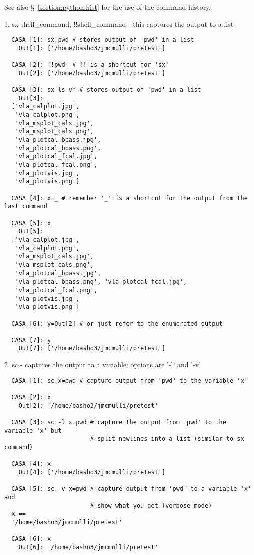 See also \S~\ref{section:python.hist} for the use of the command
history.

1. sx shell\_command, !!shell\_command - this captures the output to a list 

\small
\begin{verbatim}
  CASA [1]: sx pwd # stores output of 'pwd' in a list
    Out[1]: ['/home/basho3/jmcmulli/pretest']

  CASA [2]: !!pwd  # !! is a shortcut for 'sx'
    Out[2]: ['/home/basho3/jmcmulli/pretest']

  CASA [3]: sx ls v* # stores output of 'pwd' in a list
    Out[3]:
  ['vla_calplot.jpg',
   'vla_calplot.png',
   'vla_msplot_cals.jpg',
   'vla_msplot_cals.png',
   'vla_plotcal_bpass.jpg',
   'vla_plotcal_bpass.png',
   'vla_plotcal_fcal.jpg',
   'vla_plotcal_fcal.png',
   'vla_plotvis.jpg',
   'vla_plotvis.png']

  CASA [4]: x=_ # remember '_' is a shortcut for the output from the last command

  CASA [5]: x
    Out[5]:
  ['vla_calplot.jpg',
   'vla_calplot.png',
   'vla_msplot_cals.jpg',
   'vla_msplot_cals.png',
   'vla_plotcal_bpass.jpg',
   'vla_plotcal_bpass.png', 'vla_plotcal_fcal.jpg',
   'vla_plotcal_fcal.png',
   'vla_plotvis.jpg',
   'vla_plotvis.png']

  CASA [6]: y=Out[2] # or just refer to the enumerated output

  CASA [7]: y
    Out[7]: ['/home/basho3/jmcmulli/pretest']
\end{verbatim}
\normalsize

2. sc - captures the output to a variable; options are '-l' and '-v' 

\small
\begin{verbatim}
  CASA [1]: sc x=pwd # capture output from 'pwd' to the variable 'x'

  CASA [2]: x
    Out[2]: '/home/basho3/jmcmulli/pretest'

  CASA [3]: sc -l x=pwd # capture the output from 'pwd' to the variable 'x' but
                        # split newlines into a list (similar to sx command)

  CASA [4]: x
    Out[4]: ['/home/basho3/jmcmulli/pretest']

  CASA [5]: sc -v x=pwd # capture output from 'pwd' to a variable 'x' and
                        # show what you get (verbose mode)
  x ==
  '/home/basho3/jmcmulli/pretest'
  
  CASA [6]: x
    Out[6]: '/home/basho3/jmcmulli/pretest'
\end{verbatim}
\normalsize

